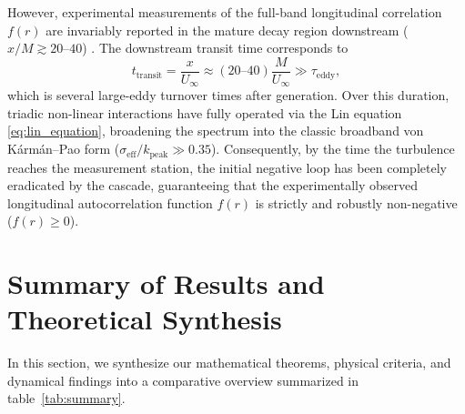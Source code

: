 \documentclass[lineno]{jfm}
\begin{document}
However, experimental measurements of the full-band longitudinal correlation $f(r)$ are invariably reported in the mature decay region downstream ($x/M \gtrsim 20\text{--}40$) \citep{StewartTownsend1951, ComteBellotCorrsin1966, ComteBellotCorrsin1971, FrenkielKlebanoffHuang1979}. The downstream transit time corresponds to
\begin{equation}
t_{\text{transit}} = \frac{x}{U_\infty} \approx (20\text{--}40) \frac{M}{U_\infty} \gg \tau_{\text{eddy}},
\end{equation}
which is several large-eddy turnover times after generation. Over this duration, triadic non-linear interactions have fully operated via the Lin equation \eqref{eq:lin_equation}, broadening the spectrum into the classic broadband von K\'arm\'an--Pao form ($\sigma_{\text{eff}}/k_{\text{peak}} \gg 0.35$). Consequently, by the time the turbulence reaches the measurement station, the initial negative loop has been completely eradicated by the cascade, guaranteeing that the experimentally observed longitudinal autocorrelation function $f(r)$ is strictly and robustly non-negative ($f(r) \ge 0$).

\section{Summary of Results and Theoretical Synthesis}
\label{sec:summary}

In this section, we synthesize our mathematical theorems, physical criteria, and dynamical findings into a comparative overview summarized in table~\ref{tab:summary}.
\end{document}
